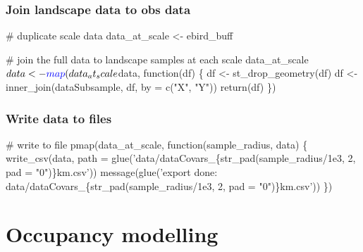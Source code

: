 \documentclass[]{article}
\newenvironment{Shaded}{}{}
\newcommand{\CommentTok}[1]{\textcolor[rgb]{0.00,0.50,0.00}{#1}}
\newcommand{\ControlFlowTok}[1]{\textcolor[rgb]{0.00,0.00,1.00}{#1}}
\newcommand{\DataTypeTok}[1]{#1}
\newcommand{\KeywordTok}[1]{\textcolor[rgb]{0.00,0.00,1.00}{#1}}
\newcommand{\NormalTok}[1]{#1}
\newcommand{\OperatorTok}[1]{#1}
\newcommand{\StringTok}[1]{\textcolor[rgb]{0.00,0.50,0.50}{#1}}
\begin{document}
\hypertarget{join-landscape-data-to-obs-data}{%
\subsubsection{Join landscape data to obs data}\label{join-landscape-data-to-obs-data}}

\begin{Shaded}
\begin{Highlighting}[]
\CommentTok{# duplicate scale data}
\NormalTok{data_at_scale <-}\StringTok{ }\NormalTok{ebird_buff}

\CommentTok{# join the full data to landscape samples at each scale}
\NormalTok{data_at_scale}\OperatorTok{$}\NormalTok{data <-}\StringTok{ }\KeywordTok{map}\NormalTok{(data_at_scale}\OperatorTok{$}\NormalTok{data, }\ControlFlowTok{function}\NormalTok{(df) \{}
\NormalTok{  df <-}\StringTok{ }\KeywordTok{st_drop_geometry}\NormalTok{(df)}
\NormalTok{  df <-}\StringTok{ }\KeywordTok{inner_join}\NormalTok{(dataSubsample, df, }\DataTypeTok{by =} \KeywordTok{c}\NormalTok{(}\StringTok{"X"}\NormalTok{, }\StringTok{"Y"}\NormalTok{))}
  \KeywordTok{return}\NormalTok{(df)}
\NormalTok{\})}
\end{Highlighting}
\end{Shaded}

\hypertarget{write-data-to-files}{%
\subsubsection{Write data to files}\label{write-data-to-files}}

\begin{Shaded}
\begin{Highlighting}[]
\CommentTok{# write to file}
\KeywordTok{pmap}\NormalTok{(data_at_scale, }\ControlFlowTok{function}\NormalTok{(sample_radius, data) \{}
  \KeywordTok{write_csv}\NormalTok{(data, }\DataTypeTok{path =} \KeywordTok{glue}\NormalTok{(}\StringTok{'data/dataCovars_\{str_pad(sample_radius/1e3, 2, pad = "0")\}km.csv'}\NormalTok{))}
  \KeywordTok{message}\NormalTok{(}\KeywordTok{glue}\NormalTok{(}\StringTok{'export done: data/dataCovars_\{str_pad(sample_radius/1e3, 2, pad = "0")\}km.csv'}\NormalTok{))}
\NormalTok{\})}
\end{Highlighting}
\end{Shaded}

\hypertarget{occupancy-modelling}{%
\section{Occupancy modelling}\label{occupancy-modelling}}
\end{document}
